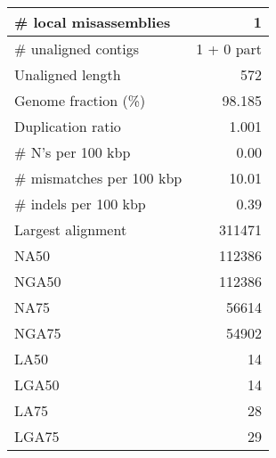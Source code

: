 \documentclass[12pt,a4paper]{article}
\begin{document}
\begin{table}[ht]
\begin{center}
\begin{tabular}{|l*{1}{|r}|}
\# local misassemblies & 1 \\ \hline
\# unaligned contigs & 1 + 0 part \\ \hline
Unaligned length & 572 \\ \hline
Genome fraction (\%) & 98.185 \\ \hline
Duplication ratio & 1.001 \\ \hline
\# N's per 100 kbp & 0.00 \\ \hline
\# mismatches per 100 kbp & 10.01 \\ \hline
\# indels per 100 kbp & 0.39 \\ \hline
Largest alignment & 311471 \\ \hline
NA50 & 112386 \\ \hline
NGA50 & 112386 \\ \hline
NA75 & 56614 \\ \hline
NGA75 & 54902 \\ \hline
LA50 & 14 \\ \hline
LGA50 & 14 \\ \hline
LA75 & 28 \\ \hline
LGA75 & 29 \\ \hline
\end{tabular}
\end{center}
\end{table}
\end{document}
